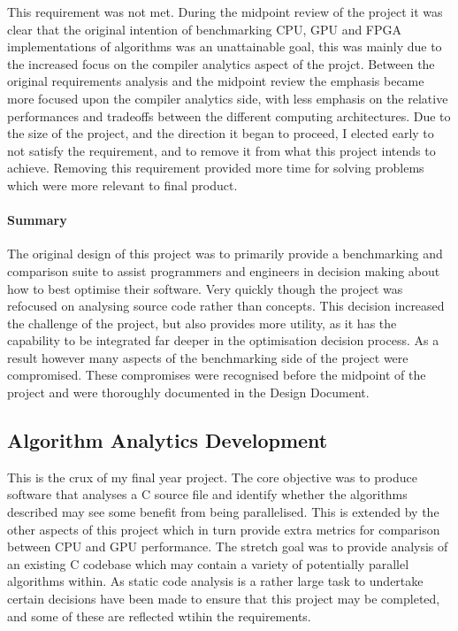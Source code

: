 This requirement was not met. During the midpoint review of the project it was clear that the
original intention of benchmarking CPU, GPU and FPGA implementations of algorithms was an
unattainable goal, this was mainly due to the increased focus on the compiler analytics aspect of
the projct. Between the original requirements analysis and the midpoint review the emphasis became
more focused upon the compiler analytics side, with less emphasis on the relative performances and
tradeoffs between the different computing architectures.  Due to the size of the project, and the
direction it began to proceed, I elected early to not satisfy the requirement, and to remove it from
what this project intends to achieve. Removing this requirement provided more time for solving
problems which were more relevant to final product.

\paragraph{Summary}
The original design of this project was to primarily provide a benchmarking and comparison suite to
assist programmers and engineers in decision making about how to best optimise their software.  Very
quickly though the project was refocused on analysing source code rather than concepts. This
decision increased the challenge of the project, but also provides more utility, as it has the
capability to be integrated far deeper in the optimisation decision process. As a result however
many aspects of the benchmarking side of the project were compromised. These compromises were
recognised before the midpoint of the project and were thoroughly documented in the Design Document.

\subsection{Algorithm Analytics Development}
This is the crux of my final year project. The core objective was to produce software that analyses
a C source file and identify whether the algorithms described may see some benefit from being
parallelised. This is extended by the other aspects of this project which in turn provide extra
metrics for comparison between CPU and GPU performance. The stretch goal was to provide analysis of
an existing C codebase which may contain a variety of potentially parallel algorithms within. As
static code analysis is a rather large task to undertake certain decisions have been made to ensure
that this project may be completed, and some of these are reflected wtihin the requirements.

